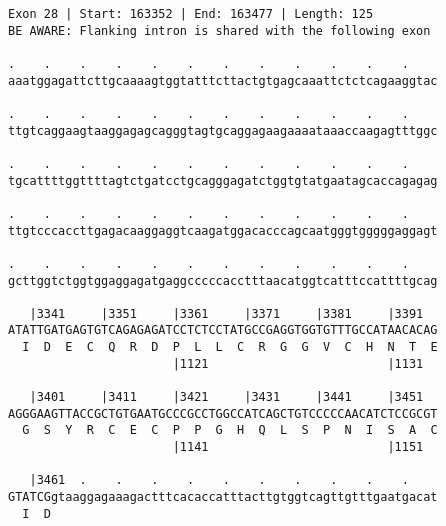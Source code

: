 \documentclass{article}
\begin{document}
\begin{Verbatim}[fontfamily=courier]
Exon 28 | Start: 163352 | End: 163477 | Length: 125
BE AWARE: Flanking intron is shared with the following exon

.    .    .    .    .    .    .    .    .    .    .    .    
aaatggagattcttgcaaaagtggtatttcttactgtgagcaaattctctcagaaggtac

.    .    .    .    .    .    .    .    .    .    .    .    
ttgtcaggaagtaaggagagcagggtagtgcaggagaagaaaataaaccaagagtttggc

.    .    .    .    .    .    .    .    .    .    .    .    
tgcattttggttttagtctgatcctgcagggagatctggtgtatgaatagcaccagagag

.    .    .    .    .    .    .    .    .    .    .    .    
ttgtcccaccttgagacaaggaggtcaagatggacacccagcaatgggtgggggaggagt

.    .    .    .    .    .    .    .    .    .    .    .    
gcttggtctggtggaggagatgaggcccccacctttaacatggtcatttccattttgcag

   |3341     |3351     |3361     |3371     |3381     |3391  
ATATTGATGAGTGTCAGAGAGATCCTCTCCTATGCCGAGGTGGTGTTTGCCATAACACAG
  I  D  E  C  Q  R  D  P  L  L  C  R  G  G  V  C  H  N  T  E
                       |1121                         |1131  

   |3401     |3411     |3421     |3431     |3441     |3451  
AGGGAAGTTACCGCTGTGAATGCCCGCCTGGCCATCAGCTGTCCCCCAACATCTCCGCGT
  G  S  Y  R  C  E  C  P  P  G  H  Q  L  S  P  N  I  S  A  C
                       |1141                         |1151  

   |3461  .    .    .    .    .    .    .    .    .    .    
GTATCGgtaaggagaaagactttcacaccatttacttgtggtcagttgtttgaatgacat
  I  D                                                      
\end{Verbatim}
\newpage
\end{document}
